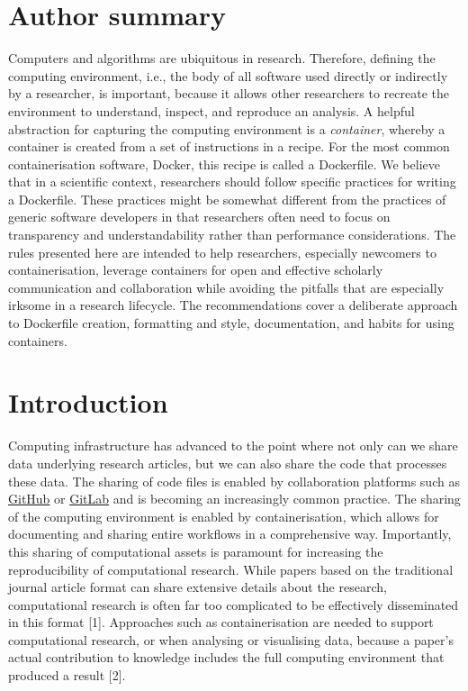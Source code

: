 \documentclass[10pt,letterpaper]{article}
\begin{document}
\section*{Author summary}
Computers and algorithms are ubiquitous in research. Therefore, defining
the computing environment, i.e., the body of all software used directly
or indirectly by a researcher, is important, because it allows other
researchers to recreate the environment to understand, inspect, and
reproduce an analysis. A helpful abstraction for capturing the computing
environment is a \emph{container}, whereby a container is created from a
set of instructions in a recipe. For the most common containerisation
software, Docker, this recipe is called a Dockerfile. We believe that in
a scientific context, researchers should follow specific practices for
writing a Dockerfile. These practices might be somewhat different from
the practices of generic software developers in that researchers often
need to focus on transparency and understandability rather than
performance considerations. The rules presented here are intended to
help researchers, especially newcomers to containerisation, leverage
containers for open and effective scholarly communication and
collaboration while avoiding the pitfalls that are especially irksome in
a research lifecycle. The recommendations cover a deliberate approach to
Dockerfile creation, formatting and style, documentation, and habits for
using containers.

\linenumbers

\hypertarget{introduction}{%
\section*{Introduction}\label{introduction}}

Computing infrastructure has advanced to the point where not only can we
share data underlying research articles, but we can also share the code
that processes these data. The sharing of code files is enabled by
collaboration platforms such as \href{https://github.com}{GitHub} or
\href{https://gitlab.com}{GitLab} and is becoming an increasingly common
practice. The sharing of the computing environment is enabled by
containerisation, which allows for documenting and sharing entire
workflows in a comprehensive way. Importantly, this sharing of
computational assets is paramount for increasing the reproducibility of
computational research. While papers based on the traditional journal
article format can share extensive details about the research,
computational research is often far too complicated to be effectively
disseminated in this format {[}1{]}. Approaches such as containerisation
are needed to support computational research, or when analysing or
visualising data, because a paper's actual contribution to knowledge
includes the full computing environment that produced a result {[}2{]}.
\end{document}
